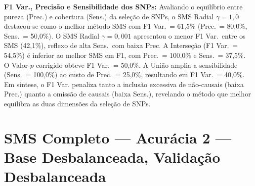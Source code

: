 \documentclass[
    12pt,
    a4paper,
    oneside,
    english,
    french,
    spanish,
    brazil
    ]{abntex2}
\newcommand{\novo}[1]{\textcolor{corNova}{#1}}
\begin{document}
\novo{\textbf{F1 Var., Precisão e Sensibilidade dos SNPs:} Avaliando o equilíbrio entre pureza (Prec.) e cobertura (Sens.) da seleção de SNPs, o SMS Radial $\gamma=1{,}0$ destacou-se como o melhor método SMS com F1 Var.\ = 61,5\% (Prec.\ = 80,0\%, Sens.\ = 50,0\%). O SMS Radial $\gamma=0{,}001$ apresentou o menor F1 Var.\ entre os SMS (42,1\%), reflexo de alta Sens.\ com baixa Prec. A Interseção (F1 Var.\ = 54,5\%) é inferior ao melhor SMS em F1, com Prec.\ = 100,0\% e Sens.\ = 37,5\%. O Valor-$p$ corrigido obteve F1 Var.\ = 50,0\%. A União amplia a sensibilidade (Sens.\ = 100,0\%) ao custo de Prec.\ = 25,0\%, resultando em F1 Var.\ = 40,0\%. Em síntese, o F1 Var. penaliza tanto a inclusão excessiva de não-causais (baixa Prec.) quanto a omissão de causais (baixa Sens.), revelando o método que melhor equilibra as duas dimensões da seleção de SNPs.}
\section{SMS Completo --- Acurácia 2 --- Base Desbalanceada, Validação Desbalanceada}
\end{document}
